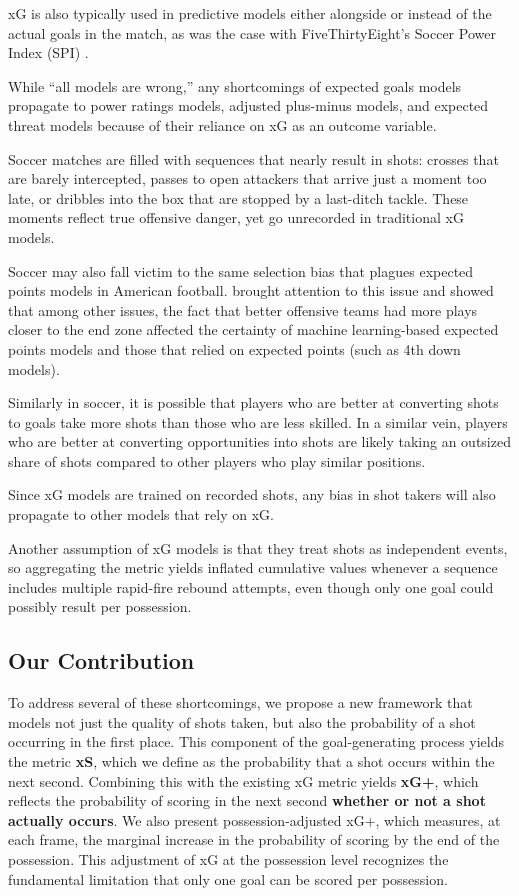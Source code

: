 \documentclass[12pt,letterpaper]{article}
\begin{document}
xG is also typically used in predictive models either alongside or instead of the actual goals in the match, as was the case with FiveThirtyEight's Soccer Power Index (SPI) \citep{fivethirtyeight_clubsoccerpredictions}.

While ``all models are wrong,'' any shortcomings of expected goals models propagate to power ratings models, adjusted plus-minus models, and expected threat models because of their reliance on xG as an outcome variable.

Soccer matches are filled with sequences that nearly result in shots: crosses that are barely intercepted, passes to open attackers that arrive just a moment too late, or dribbles into the box that are stopped by a last-ditch tackle. These moments reflect true offensive danger, yet go unrecorded in traditional xG models. 

Soccer may also fall victim to the same selection bias that plagues expected points models in American football. \cite{brill2025analytics} brought attention to this issue and showed that among other issues, the fact that better offensive teams had more plays closer to the end zone affected the certainty of machine learning-based expected points models and those that relied on expected points (such as 4th down models).

Similarly in soccer, it is possible that players who are better at converting shots to goals take more shots than those who are less skilled. In a similar vein, players who are better at converting opportunities into shots are likely taking an outsized share of shots compared to other players who play similar positions.

Since xG models are trained on recorded shots, any bias in shot takers will also propagate to other models that rely on xG.

Another assumption of xG models is that they treat shots as independent events, so aggregating the metric yields inflated cumulative values whenever a sequence includes multiple rapid-fire rebound attempts, even though only one goal could possibly result per possession.

\subsection{Our Contribution}

To address several of these shortcomings, we propose a new framework that models not just the quality of shots taken, but also the probability of a shot occurring in the first place. This component of the goal-generating process yields the metric \textbf{xS}, which we define as the probability that a shot occurs within the next second. Combining this with the existing xG metric yields \textbf{xG+}, which reflects the probability of scoring in the next second \textbf{whether or not a shot actually occurs}. We also present possession-adjusted xG+, which measures, at each frame, the marginal increase in the probability of scoring by the end of the possession. This adjustment of xG at the possession level recognizes the fundamental limitation that only one goal can be scored per possession.
  
\end{document}
